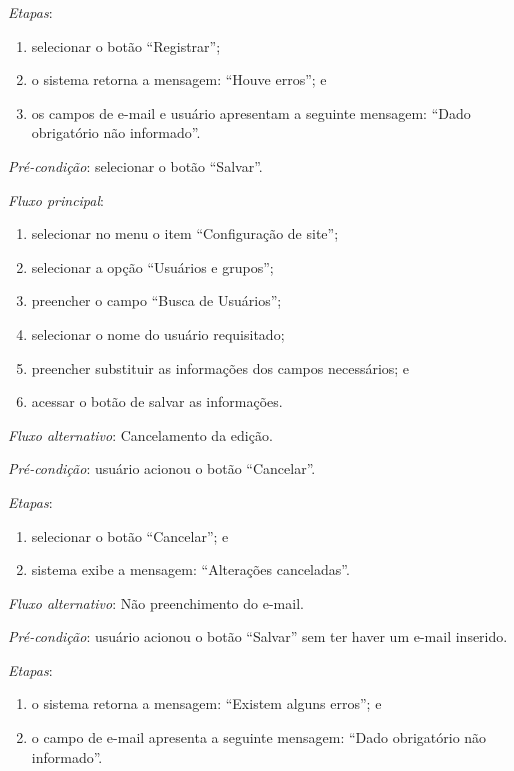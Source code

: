 \documentclass[a4paper,12pt]{article}
\begin{document}
\noindent \textit{Etapas}:

\begin{enumerate}
    \item selecionar o botão ``Registrar'';
    \item o sistema retorna a mensagem: ``Houve erros''; e
    \item os campos de e-mail e usuário apresentam a seguinte mensagem: ``Dado obrigatório não informado''.
\end{enumerate}


\vspace{0.7cm}

\noindent \textit{Pré-condição}: selecionar o botão ``Salvar''.

\noindent \textit{Fluxo principal}:

\begin{enumerate}
    \item selecionar no menu o item ``Configuração de site'';
    \item selecionar a opção ``Usuários e grupos'';
    \item preencher o campo ``Busca de Usuários'';
    \item selecionar o nome do usuário requisitado;
    \item preencher substituir as informações dos campos necessários; e
    \item acessar o botão de salvar as informações.
\end{enumerate}

\noindent \textit{Fluxo alternativo}: Cancelamento da edição.

\noindent \textit{Pré-condição}: usuário acionou o botão ``Cancelar''.

\noindent \textit{Etapas}:

\begin{enumerate}
    \item selecionar o botão ``Cancelar''; e
    \item sistema exibe a mensagem: ``Alterações canceladas''.
\end{enumerate}

\noindent \textit{Fluxo alternativo}: Não preenchimento do e-mail.

\noindent \textit{Pré-condição}: usuário acionou o botão ``Salvar'' sem ter haver um e-mail inserido.

\noindent \textit{Etapas}:

\begin{enumerate}
    \item o sistema retorna a mensagem: ``Existem alguns erros''; e
    \item o campo de e-mail apresenta a seguinte mensagem: ``Dado obrigatório não informado''.
\end{enumerate}
\end{document}
